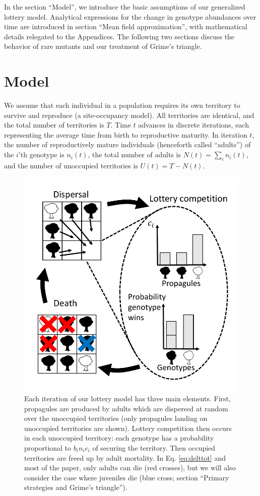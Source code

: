\documentclass[11pt]{article}
\begin{document}
In the section ``Model'', we introduce the basic assumptions of our generalized lottery model. Analytical expressions for the change in genotype abundances over time are introduced in section ``Mean field approximation'', with mathematical details relegated to the Appendices. The following two sections discuss the behavior of rare mutants and our treatment of Grime's triangle. 
 
\section*{Model}\label{sec:model}

We assume that each individual in a population requires its own territory to survive and reproduce (a site-occupancy model). All territories are identical, and the total number of territories is $T$. Time $t$ advances in discrete iterations, each representing the average time from birth to reproductive maturity. In iteration $t$, the number of reproductively mature individuals (henceforth called ``adults'') of the $i$'th genotype is $n_i(t)$, the total number of adults is $N(t)=\sum_i n_i(t)$, and the number of unoccupied territories is $U(t)=T-N(t)$. 

\begin{figure}
\centering
\includegraphics[scale=0.8]{lottery.pdf}
\caption{\label{fig:lottery} Each iteration of our lottery model has three main elements. First, propagules are produced by adults which are dispersed at random over the unoccupied territories (only propagules landing on unoccupied territories are shown). Lottery competition then occurs in each unoccupied territory: each genotype has a probability proportional to $b_i n_i c_i$ of securing the territory. Then occupied territories are freed up by adult mortality. In Eq. \eqref{eq:delttot} and most of the paper, only adults can die (red crosses), but we will also consider the case where juveniles die (blue cross; section ``Primary strategies and Grime's triangle'').}
\end{figure}
\end{document}
